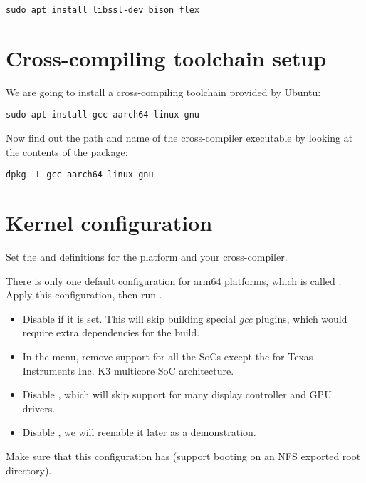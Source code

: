 \begin{verbatim}
sudo apt install libssl-dev bison flex
\end{verbatim}

\section{Cross-compiling toolchain setup}

We are going to install a cross-compiling toolchain provided by Ubuntu:

\begin{verbatim}
sudo apt install gcc-aarch64-linux-gnu
\end{verbatim}

Now find out the path and name of the cross-compiler executable by looking at the contents of the package:

\begin{verbatim}
dpkg -L gcc-aarch64-linux-gnu
\end{verbatim}

\section{Kernel configuration}

Set the  and  definitions for the 
platform and your cross-compiler.

There is only one default configuration for arm64 platforms, which is called
. Apply this configuration, then run .

\begin{itemize}
\item Disable  if it is set. This will skip
  building special {\em gcc} plugins, which would require extra dependencies
  for the build.
\item In the  menu, remove support for all the SoCs except
the for Texas Instruments Inc. K3 multicore SoC architecture.
\item Disable , which will skip support for many display
controller and GPU drivers.
\item Disable , we will reenable it later as a demonstration.
\end{itemize}

Make sure that this configuration has  (support
booting on an NFS exported root directory).

